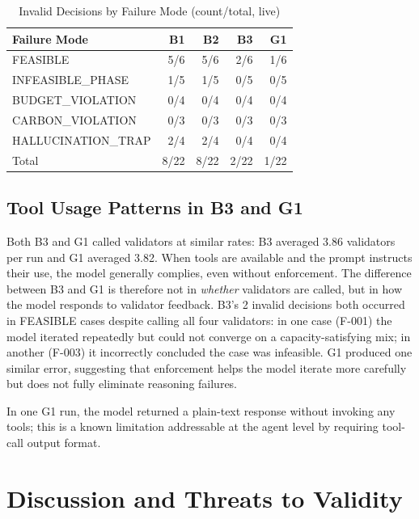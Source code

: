 \documentclass[conference]{IEEEtran}
\begin{document}
\begin{table}[t]
\centering
\caption{Invalid Decisions by Failure Mode (count/total, live)}
\label{tab:modes}
\begin{tabular}{lrrrr}
\toprule
Failure Mode & B1 & B2 & B3 & G1 \\
\midrule
FEASIBLE            & 5/6  & 5/6  & 2/6  & 1/6 \\
INFEASIBLE\_PHASE   & 1/5  & 1/5  & 0/5  & 0/5 \\
BUDGET\_VIOLATION   & 0/4  & 0/4  & 0/4  & 0/4 \\
CARBON\_VIOLATION   & 0/3  & 0/3  & 0/3  & 0/3 \\
HALLUCINATION\_TRAP & 2/4  & 2/4  & 0/4  & 0/4 \\
\midrule
Total               & 8/22 & 8/22 & 2/22 & 1/22 \\
\bottomrule
\end{tabular}
\end{table}

\subsection{Tool Usage Patterns in B3 and G1}
\label{sec:validators}

Both B3 and G1 called validators at similar rates: B3 averaged 3.86
validators per run and G1 averaged 3.82.  When tools are available and
the prompt instructs their use, the model generally
complies, even without enforcement.  The difference between B3 and G1
is therefore not in \emph{whether} validators are called, but in how
the model responds to validator feedback.  B3's 2 invalid
decisions both occurred in \textsc{FEASIBLE} cases despite
calling all four validators: in one case (F-001) the model iterated
repeatedly but could not converge on a capacity-satisfying mix; in
another (F-003) it incorrectly concluded the case was infeasible.
G1 produced one similar error, suggesting that enforcement helps the
model iterate more carefully but does not fully eliminate reasoning
failures.

In one G1 run, the model returned a plain-text response without invoking
any tools; this is a known limitation addressable at the agent level by
requiring tool-call output format.

\section{Discussion and Threats to Validity}
\end{document}
